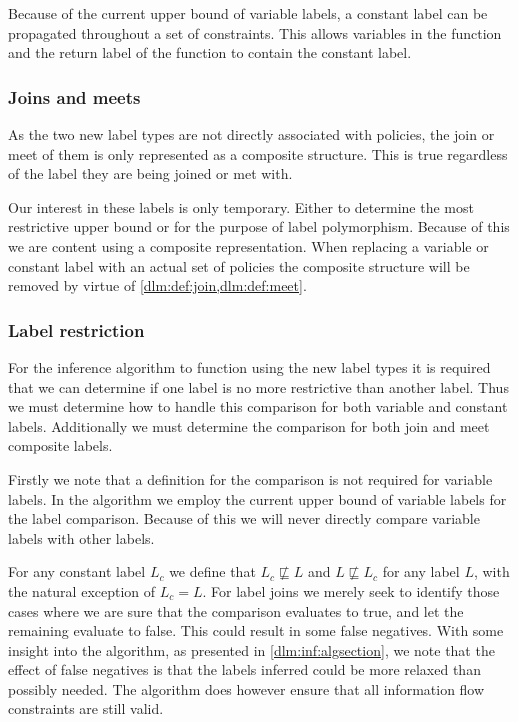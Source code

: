 Because of the current upper bound of variable labels, a constant label can be propagated throughout a set of constraints.
This allows variables in the function and the return label of the function to contain the constant label.

\subsubsection{Joins and meets}
As the two new label types are not directly associated with policies, the join or meet of them is only represented as a composite structure.
This is true regardless of the label they are being joined or met with.

Our interest in these labels is only temporary.
Either to determine the most restrictive upper bound or for the purpose of label polymorphism.
Because of this we are content using a composite representation.
When replacing a variable or constant label with an actual set of policies the composite structure will be removed by virtue of \cref{dlm:def:join,dlm:def:meet}.

\subsubsection{Label restriction}
For the inference algorithm to function using the new label types it is required that we can determine if one label is no more restrictive than another label.
Thus we must determine how to handle this comparison for both variable and constant labels.
Additionally we must determine the comparison for both join and meet composite labels.

Firstly we note that a definition for the comparison is not required for variable labels.
In the algorithm we employ the current upper bound of variable labels for the label comparison.
Because of this we will never directly compare variable labels with other labels.

For any constant label $L_c$ we define that $L_c \not \sqsubseteq L$ and $L \not \sqsubseteq L_c$ for any label $L$, with the natural exception of $L_c = L$.
For label joins we merely seek to identify those cases where we are sure that the comparison evaluates to true, and let the remaining evaluate to false.
This could result in some false negatives.
With some insight into the algorithm, as presented in \cref{dlm:inf:algsection}, we note that the effect of false negatives is that the labels inferred could be more relaxed than possibly needed.
The algorithm does however ensure that all information flow constraints are still valid.

